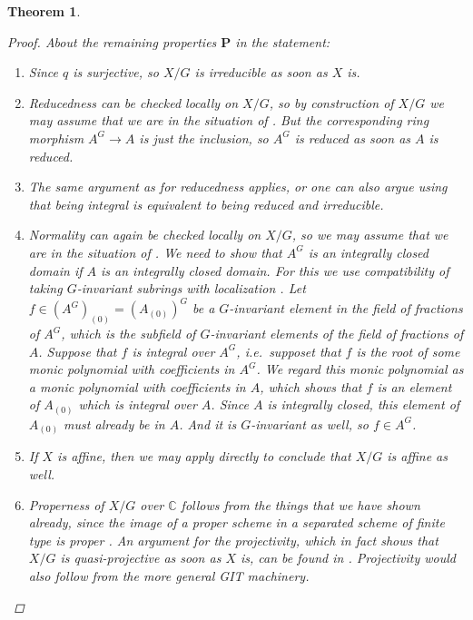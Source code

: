 \documentclass[12pt,a4paper]{amsart}
\theoremstyle{plain}
\newtheorem{thm}{Theorem}[section]
\theoremstyle{definition}
\theoremstyle{remark}
\begin{document}
\begin{thm}
\begin{proof}
    About the remaining properties $\mathbf{P}$ in the statement:
    \begin{enumerate}[label=(\alph*)]
      \item Since $q$ is surjective, so $X/G$ is irreducible as soon as $X$ is.
      \item Reducedness can be checked locally on $X/G$, so by construction of $X/G$ we may assume that we are in the situation of .
        But the corresponding ring morphism $A^{G} \to A$ is just the inclusion, so $A^{G}$ is reduced as soon as $A$ is reduced.
      \item The same argument as for reducedness applies, or one can also argue using that being integral is equivalent to being reduced and irreducible.
      \item Normality can again be checked locally on $X/G$, so we may assume that we are in the situation of .
        We need to show that $A^{G}$ is an integrally closed domain if $A$ is an integrally closed domain.
        For this we use compatibility of taking $G$-invariant subrings with localization \cite[Exercise 5.12]{am69}.
        Let $f \in (A^{G})_{(0)} = (A_{(0)})^{G}$ be a $G$-invariant element in the field of fractions of $A^{G}$, which is the subfield of $G$-invariant elements of the field of fractions of $A$.
        Suppose that $f$ is integral over $A^{G}$, i.e.~supposet that $f$ is the root of some monic polynomial with coefficients in $A^{G}$.
        We regard this monic polynomial as a monic polynomial with coefficients in $A$, which shows that $f$ is an element of $A_{(0)}$ which is integral over $A$.
        Since $A$ is integrally closed, this element of $A_{(0)}$ must already be in $A$.
        And it is $G$-invariant as well, so $f \in A^{G}$.
      \item If $X$ is affine, then we may apply  directly to conclude that $X/G$ is affine as well.
      \item Properness of $X/G$ over $\mathbb{C}$ follows from the things that we have shown already, since the image of a proper scheme in a separated scheme of finite type is proper \cite[\href{https://stacks.math.columbia.edu/tag/03GN}{Tag 03GN}]{stacks-project}.
        An argument for the projectivity, which in fact shows that $X/G$ is quasi-projective as soon as $X$ is, can be found in \cite[Proposition IV.1.5]{knu71}.
        Projectivity would also follow from the more general GIT machinery.
    \end{enumerate}
  \end{proof}
\end{thm}



\vfill
\end{document}
